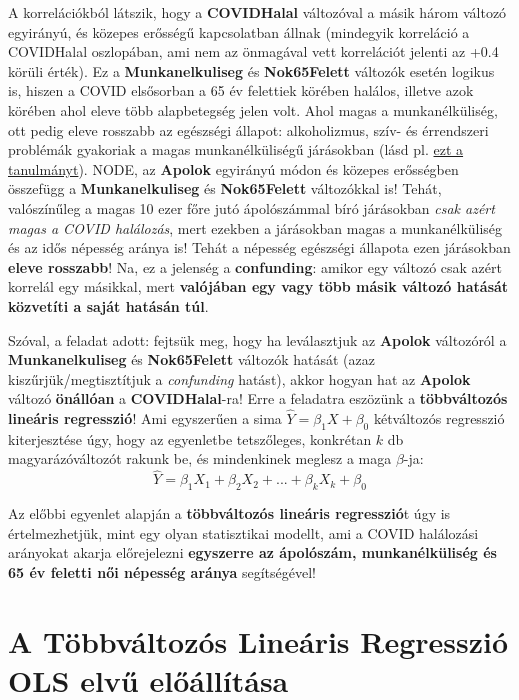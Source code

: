 \documentclass[
]{book}
\begin{document}
A korrelációkból látszik, hogy a \textbf{COVIDHalal} változóval a másik három változó egyirányú, és közepes erősségű kapcsolatban állnak (mindegyik korreláció a COVIDHalal oszlopában, ami nem az önmagával vett korrelációt jelenti az +0.4 körüli érték). Ez a \textbf{Munkanelkuliseg} és \textbf{Nok65Felett} változók esetén logikus is, hiszen a COVID elsősorban a 65 év felettiek körében halálos, illetve azok körében ahol eleve több alapbetegség jelen volt. Ahol magas a munkanélküliség, ott pedig eleve rosszabb az egészségi állapot: alkoholizmus, szív- és érrendszeri problémák gyakoriak a magas munkanélküliségű járásokban (lásd pl. \href{https://reader.elsevier.com/reader/sd/pii/S0927537120300609?token=E1AD2E1805FB5308BC40754433D867BE2D6F2FEC1EECA824AFAFC2F37BF35723550C07B43E62BE53CD9F6822494FF445&originRegion=eu-west-1&originCreation=20211005092903}{ezt a tanulmányt}).
NODE, az \textbf{Apolok} egyirányú módon és közepes erősségben összefügg a \textbf{Munkanelkuliseg} és \textbf{Nok65Felett} változókkal is! Tehát, valószínűleg a magas 10 ezer főre jutó ápolószámmal bíró járásokban \emph{csak azért magas a COVID halálozás}, mert ezekben a járásokban magas a munkanélküliség és az idős népesség aránya is! Tehát a népesség egészségi állapota ezen járásokban \textbf{eleve rosszabb}!
Na, ez a jelenség a \textbf{confunding}: amikor egy változó csak azért korrelál egy másikkal, mert \textbf{valójában egy vagy több másik változó hatását közvetíti a saját hatásán túl}.

Szóval, a feladat adott: fejtsük meg, hogy ha leválasztjuk az \textbf{Apolok} változóról a \textbf{Munkanelkuliseg} és \textbf{Nok65Felett} változók hatását (azaz kiszűrjük/megtisztítjuk a \emph{confunding} hatást), akkor hogyan hat az \textbf{Apolok} változó \textbf{önállóan} a \textbf{COVIDHalal}-ra!
Erre a feladatra eszözünk a \textbf{többváltozós lineáris regresszió}! Ami egyszerűen a sima \(\hat{Y}=\beta_1 X + \beta_0\) kétváltozós regresszió kiterjesztése úgy, hogy az egyenletbe tetszőleges, konkrétan \(k\) db magyarázóváltozót rakunk be, és mindenkinek meglesz a maga \(\beta\)-ja:
\[\hat{Y}=\beta_1 X_1 + \beta_2 X_2 + ... + \beta_k X_k + \beta_0\]

Az előbbi egyenlet alapján a \textbf{többváltozós lineáris regresszió}t úgy is értelmezhetjük, mint egy olyan statisztikai modellt, ami a COVID halálozási arányokat akarja előrejelezni \textbf{egyszerre az ápolószám, munkanélküliség és 65 év feletti női népesség aránya} segítségével!

\section{A Többváltozós Lineáris Regresszió OLS elvű előállítása}\label{a-tuxf6bbvuxe1ltozuxf3s-lineuxe1ris-regressziuxf3-ols-elvux171-elux151uxe1lluxedtuxe1sa}
\end{document}
